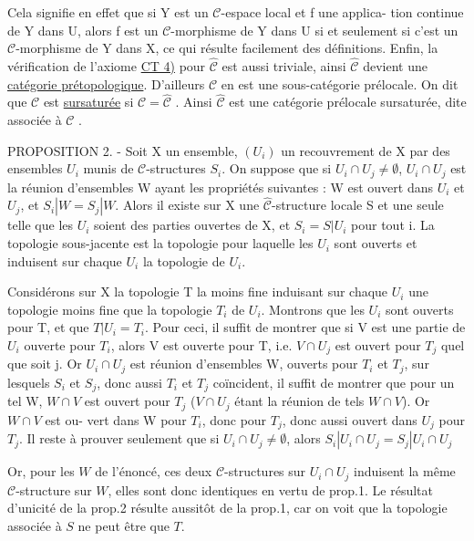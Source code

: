 
Cela signifie en effet que si Y est un $\mathcal{C}$-espace local et f une applica-
tion continue de Y dans U, alors f est un $\mathcal{C}$-morphisme de Y dans U si et
seulement si c'est un $\mathcal{C}$-morphisme de Y dans X, ce qui résulte facilement
des définitions. Enfin, la vérification de l'axiome \underline{CT 4)} pour $\hat{\mathcal{C}}$ est
aussi triviale, ainsi $\hat{\mathcal{C}}$ devient une \underline{catégorie prétopologique}. D'ailleurs
$\mathcal{C}$ en est une sous-catégorie prélocale. On dit que $\mathcal{C}$ est \underline{sursaturée}
si $\mathcal{C} = \hat{\mathcal{C}}$ . Ainsi $\hat{\mathcal{C}}$ est une catégorie prélocale sursaturée, dite
associée à $\mathcal{C}$ .

PROPOSITION 2. - Soit X un ensemble, $(U_i)$ un recouvrement de X par des
ensembles $U_i$ munis de $\mathcal{C}$-structures $S_i$. On suppose que si $U_i \cap U_j \neq \emptyset$,
$U_i \cap U_j$ est la réunion d'ensembles W ayant les propriétés suivantes : W
est ouvert dans $U_i$ et $U_j$, et $S_i | W = S_j | W$. Alors il existe sur X une
$\hat{\mathcal{C}}$-structure locale S et une seule telle que les $U_i$ soient des parties
ouvertes de X, et $S_i = S | U_i$ pour tout i. La topologie sous-jacente est la
topologie pour laquelle les $U_i$ sont ouverts et induisent sur chaque $U_i$
la topologie de $U_i$.

Considérons sur X la topologie T la moins fine induisant sur chaque
$U_i$ une topologie moins fine que la topologie $T_i$ de $U_i$. Montrons que les
$U_i$ sont ouverts pour T, et que $T | U_i = T_i$. Pour ceci, il suffit de montrer
que si V est une partie de $U_i$ ouverte pour $T_i$, alors V est ouverte pour
T, i.e. $V \cap U_j$ est ouvert pour $T_j$ quel que soit j. Or $U_i \cap U_j$ est réunion
d'ensembles W, ouverts pour $T_i$ et $T_j$, sur lesquels $S_i$ et $S_j$, donc aussi
$T_i$ et $T_j$ coïncident, il suffit de montrer que pour un tel W, $W \cap V$ est
ouvert pour $T_j$ ($V \cap U_j$ étant la réunion de tels $W \cap V$). Or $W \cap V$ est ou-
vert dans W pour $T_i$, donc pour $T_j$, donc aussi ouvert dans $U_j$ pour $T_j$.
Il reste à prouver seulement que si $U_i \cap U_j \neq \emptyset$, alors $S_i | U_i \cap U_j = S_j | U_i \cap U_j$

\newpage



Or, pour les $W$ de l'énoncé, ces deux $\mathcal{C}$-structures sur $U_i \cap U_j$ induisent
la même $\mathcal{C}$-structure sur $W$, elles sont donc identiques en vertu de prop.1.
Le résultat d'unicité de la prop.2 résulte aussitôt de la prop.1, car on
voit que la topologie associée à $S$ ne peut être que $T$.

